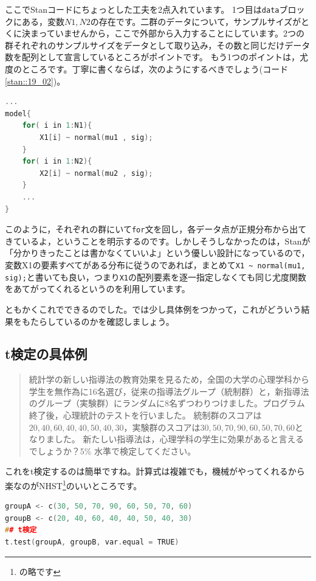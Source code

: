 \documentclass{ltjsbook}
\begin{document}
ここでStanコードにちょっとした工夫を2点入れています。
1つ目は\texttt{data}ブロックにある，変数$N1,N2$の存在です。二群のデータについて，サンプルサイズがとくに決まっていませんから，ここで外部から入力することにしています。2つの群それぞれのサンプルサイズをデータとして取り込み，その数と同じだけデータ数を配列として宣言しているところがポイントです。
もう1つのポイントは，尤度のところです。丁寧に書くならば，次のようにするべきでしょう(コード\ref{stan::19_02})。
\begin{lstlisting}[language=C++,label={stan::19_02},caption={丁寧な尤度の記載}]
    ...
model{
    for( i in 1:N1){
        X1[i] ~ normal(mu1 , sig);
    }
    for( i in 1:N2){
        X2[i] ~ normal(mu2 , sig);
    }
    ...
}

\end{lstlisting}

このように，それぞれの群にいて\texttt{for}文を回し，各データ点が正規分布から出てきているよ，ということを明示するのです。しかしそうしなかったのは，Stanが「分かりきったことは書かなくていいよ」という優しい設計になっているので，変数X1の要素すべてがある分布に従うのであれば，まとめて\verb|X1 ~ normal(mu1, sig);|と書いても良い，つまり\verb|X1|の配列要素を逐一指定しなくても同じ尤度関数をあてがってくれるというのを利用しています。

ともかくこれでできるのでした。では少し具体例をつかって，これがどういう結果をもたらしているのかを確認しましょう。
\subsection{t検定の具体例}
\begin{quote}
	統計学の新しい指導法の教育効果を見るため，全国の大学の心理学科から学生を無作為に16名選び，従来の指導法グループ（統制群）と，新指導法のグループ（実験群）にランダムに8名ずつわりつけました。プログラム終了後，心理統計のテストを行いました。
	統制群のスコアは$20, 40, 60, 40, 40, 50, 40, 30$，実験群のスコアは$30, 50, 70, 90, 60, 50, 70, 60$となりました。
	新たしい指導法は，心理学科の学生に効果があると言えるでしょうか？5\% 水準で検定してください。
\end{quote}

これをt検定するのは簡単ですね。計算式は複雑でも，機械がやってくれるから楽なのがNHST\footnote{の略です}のいいところです。
\begin{lstlisting}[language=c++,label={code:19_03},caption={帰無仮説検定のコード}]
groupA <- c(30, 50, 70, 90, 60, 50, 70, 60)
groupB <- c(20, 40, 60, 40, 40, 50, 40, 30)
## t検定
t.test(groupA, groupB, var.equal = TRUE)
\end{lstlisting}
\end{document}
